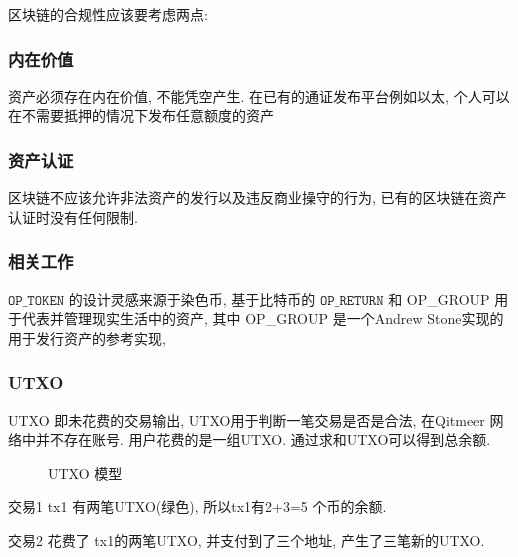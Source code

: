 \documentclass[a4paper,11pt]{article}
\begin{document}
区块链的合规性应该要考虑两点:

\subsubsection*{内在价值}

资产必须存在内在价值, 不能凭空产生. 在已有的通证发布平台例如以太\cite{Ethereum}, 个人可以在不需要抵押的情况下发布任意额度的资产
 

\subsubsection*{资产认证}
区块链不应该允许非法资产的发行以及违反商业操守的行为, 已有的区块链在资产认证时没有任何限制. 

\subsubsection{相关工作}

$\texttt{OP\_TOKEN}$ 的设计灵感来源于染色币, 基于比特币的 $\texttt{OP\_RETURN}$ 和  OP\_GROUP  用于代表并管理现实生活中的资产, 其中 OP\_GROUP 是一个Andrew Stone实现的用于发行资产的参考实现, 

\subsubsection*{UTXO}

UTXO 即未花费的交易输出, UTXO用于判断一笔交易是否是合法, 在Qitmeer 网络中并不存在账号. 用户花费的是一组UTXO. 通过求和UTXO可以得到总余额.

\begin{figure}[hbt]
	\centerline{%
	}
\caption{UTXO 模型}
\end{figure}

交易1 tx1 有两笔UTXO(绿色), 所以tx1有2+3=5 个币的余额.

交易2 花费了 tx1的两笔UTXO, 并支付到了三个地址, 产生了三笔新的UTXO.
\end{document}
